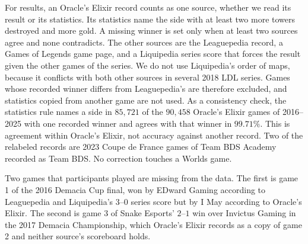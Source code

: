 \documentclass[11pt]{article}
\begin{document}
For results, an Oracle's Elixir record counts as one source, whether we read its result or its statistics. Its statistics name the side with at least two more towers destroyed and more gold. A missing winner is set only when at least two sources agree and none contradicts. The other sources are the Leaguepedia record, a Games of Legends game page, and a Liquipedia series score that forces the result given the other games of the series. We do not use Liquipedia's order of maps, because it conflicts with both other sources in several 2018 LDL series. Games whose recorded winner differs from Leaguepedia's are therefore excluded, and statistics copied from another game are not used. As a consistency check, the statistics rule names a side in $85{,}721$ of the $90{,}458$ Oracle's Elixir games of 2016--2025 with one recorded winner and agrees with that winner in $99.71\%$. This is agreement within Oracle's Elixir, not accuracy against another record. Two of the relabeled records are 2023 Coupe de France games of Team BDS Academy recorded as Team BDS. No correction touches a Worlds game.

Two games that participants played are missing from the data. The first is game 1 of the 2016 Demacia Cup final, won by EDward Gaming according to Leaguepedia and Liquipedia's $3$--$0$ series score but by I May according to Oracle's Elixir. The second is game 3 of Snake Esports' $2$--$1$ win over Invictus Gaming in the 2017 Demacia Championship, which Oracle's Elixir records as a copy of game 2 and neither source's scoreboard holds.
\end{document}

